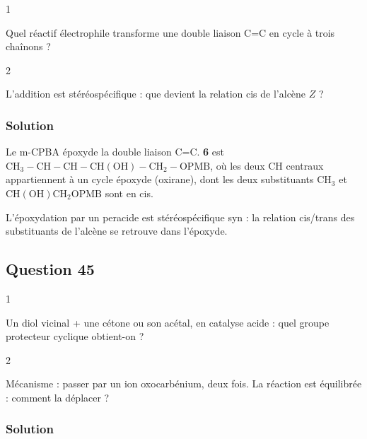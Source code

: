 \documentclass[11pt,a4paper]{article}
\begin{document}
\begin{indication}{1}

Quel réactif électrophile transforme une double liaison C=C en cycle à trois chaînons ?

\end{indication}

\begin{indication}{2}

L'addition est stéréospécifique : que devient la relation cis de l'alcène \(Z\) ?

\end{indication}

\hypertarget{solution-43}{%
\subsubsection{Solution}\label{solution-43}}

Le m-CPBA époxyde la double liaison C=C. \textbf{6} est \(\mathrm{CH_3{-}CH{-}CH{-}CH(OH){-}CH_2{-}OPMB}\), où les deux CH centraux appartiennent à un cycle époxyde (oxirane), dont les deux substituants \(\mathrm{CH_3}\) et \(\mathrm{CH(OH)CH_2OPMB}\) sont en cis.

\begin{methode}

L'époxydation par un peracide est stéréospécifique syn : la relation cis/trans des substituants de l'alcène se retrouve dans l'époxyde.

\end{methode}

\hypertarget{question-45}{%
\subsection{Question 45}\label{question-45}}

\begin{indication}{1}

Un diol vicinal + une cétone ou son acétal, en catalyse acide : quel groupe protecteur cyclique obtient-on ?

\end{indication}

\begin{indication}{2}

Mécanisme : passer par un ion oxocarbénium, deux fois. La réaction est équilibrée : comment la déplacer ?

\end{indication}

\hypertarget{solution-44}{%
\subsubsection{Solution}\label{solution-44}}
\end{document}
